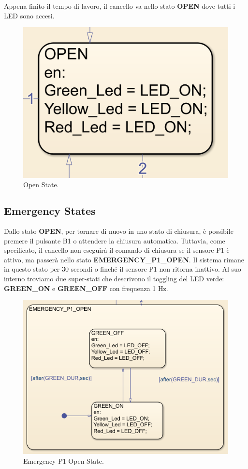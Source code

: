\documentclass[12pt]{article}
\begin{document}
Appena finito il tempo di lavoro, il cancello va nello stato \textbf{OPEN} dove tutti i LED sono accesi.

\begin{figure}[H]
    \centering
    \includegraphics[width=1\textwidth]{Immagini_State_Flow/Open.png}
    \caption{Open State.}
\end{figure}

\subsection{Emergency States}

Dallo stato \textbf{OPEN}, per tornare di nuovo in uno stato di chiusura, è possibile premere il pulsante B1 o attendere la chiusura automatica. Tuttavia, come specificato, il cancello non eseguirà il comando di chiusura se il sensore P1 è attivo, ma passerà nello stato \textbf{EMERGENCY\_P1\_OPEN}. Il sistema rimane in questo stato per 30 secondi o finché il sensore P1 non ritorna inattivo. Al suo interno troviamo due super-stati che descrivono il toggling del LED verde: \textbf{GREEN\_ON} e \textbf{GREEN\_OFF} con frequenza 1 Hz.

\begin{figure}[H]
    \centering
    \includegraphics[width=1\textwidth]{Immagini_State_Flow/Emergency_P1_Open.png}
    \caption{Emergency P1 Open State.}
\end{figure}
\end{document}

